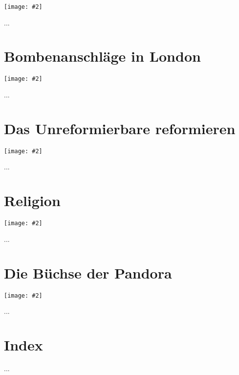 \documentclass[12pt]{memoir}
\newcommand{\img}[3]{\begin{center}%
\texttt{[image: \#2]}\\{\small\em#3}%
\end{center}}
\begin{document}
\img{scale=0.6}{Man_Reading_Koran.jpg}{}

...

\chapter{Bombenanschläge in London}

\img{scale=1.2}{London_Bombings.jpg}{}

...

\chapter{Das Unreformierbare reformieren}

\img{scale=0.4}{Quranic_Script.jpg}{}

...

\chapter{Religion}

\img{scale=0.6}{Neasden_Temple.jpg}{}

...

\chapter{Die Büchse der Pandora}

\img{scale=0.5}{Pandoras_Box.jpg}{}

...

\backmatter

\chapter{Index}
...
\end{document}
